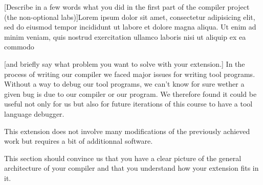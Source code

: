 [Describe in a few words what you did in the first part of the compiler project
(the non-optional labs)]Lorem ipsum dolor sit amet, consectetur adipisicing elit, sed do eiusmod
tempor incididunt ut labore et dolore magna aliqua. Ut enim ad minim veniam,
quis nostrud exercitation ullamco laboris nisi ut aliquip ex ea commodo

[and briefly say what problem you want to solve with
your extension.] In the process of writing our compiler we faced major issues for writing tool programs. Without a way to debug our tool programs, we can't know for sure wether a given bug is due to our compiler or our program. We therefore found it could be useful not only for us but also for future iterations of this course to have a tool language debugger. 

This extension does not involve many modifications of the previously achieved work but requires a bit of additionnal software. 



This section should convince us that you have a clear picture of the general
architecture of your compiler and that you understand how your extension fits
in it.
